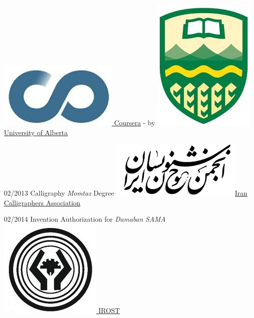 \documentclass[a4paper]{friggeri-cv}
\begin{document}
\begin{entrylist}
        {\href{http://coursera.org/}{\includegraphics[scale=0.08]{../assets/images/logos/Coursera_logo.jpg} Coursera} - by \href{https://www.ualberta.ca/}{\includegraphics[scale=0.05]{../assets/images/logos/UAlberta_logo.jpg} University of Alberta}}
        {}

        \entry
        {02/2013}
        {Calligraphy \emph{Momtaz} Degree}
        {\href{http://calligraphers.ir/}{\includegraphics[scale=0.15]{../assets/images/logos/Khoshnevisan_logo.png}Iran Calligraphers Association}}
        {}

        \entry
        {02/2014}
        {Invention Authorization for \emph{Damaban SAMA}}
        {\href{http://www.irost.org/}{\includegraphics[scale=0.09]{../assets/images/logos/IROST_logo.jpg} IROST}}
        {}

    \end{entrylist}

\end{document}
